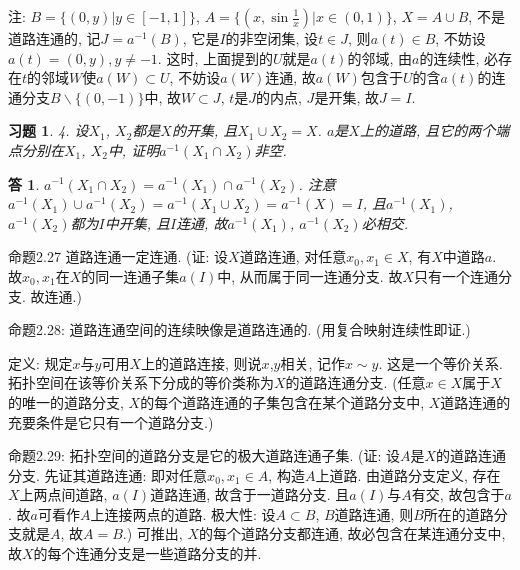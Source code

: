 \documentclass{ctexart}%
\newtheorem*{exercise}{习题}
\newtheorem*{solution}{答}
\theoremstyle{definition}
\theoremstyle{remark}
\begin{document}
注:  $B=\{(0,y)|y\in [-1,1]\}$, $A=\{(x,\sin\frac{1}{x})|x\in (0,1)\}$, $X=A\cup B$, 不是道路连通的,  记$J=a^{-1}(B)$, 它是$I$的非空闭集, 设$t\in J$, 则$a(t)\in B$, 不妨设$a(t)=(0,y), y\neq -1$. 这时, 上面提到的$U$就是$a(t)$的邻域, 由$a$的连续性, 必存在$t$的邻域$W$使$a(W)\subset U$, 不妨设$a(W)$连通, 故$a(W)$包含于$U$的含$a(t)$的连通分支$B\backslash\{(0,-1)\}$中, 故$W\subset J$, $t$是$J$的内点, $J$是开集, 故$J=I$.  

\begin{exercise}4. 设$X_1$, $X_2$都是$X$的开集, 且$X_1\cup X_2= X$. $a$是$X$上的道路, 且它的两个端点分别在$X_1$, $X_2$中, 证明$a^{-1}(X_1\cap X_2)$非空.
\end{exercise}
\begin{solution}
$a^{-1}(X_1\cap X_2)= a^{-1}(X_1) \cap a^{-1}(X_2)$. 注意$a^{-1}(X_1)\cup a^{-1}(X_2) =a^{-1}(X_1\cup X_2)=a^{-1}(X)= I$, 且$a^{-1}(X_1) $, $a^{-1}(X_2)$都为$I$中开集, 且$I$连通, 故$a^{-1}(X_1) $, $a^{-1}(X_2)$必相交. 
\end{solution}

命题2.27 道路连通一定连通. (证: 设$X$道路连通, 对任意$x_0, x_1\in X$, 有$X$中道路$a$. 故$x_0, x_1$在$X$的同一连通子集$a(I)$中, 从而属于同一连通分支. 故$X$只有一个连通分支. 故连通.)

命题2.28: 道路连通空间的连续映像是道路连通的. (用复合映射连续性即证.)

定义: 规定$x$与$y$可用$X$上的道路连接, 则说$x$,$y$相关, 记作$x\sim y$. 这是一个等价关系. 拓扑空间在该等价关系下分成的等价类称为$X$的道路连通分支. (任意$x\in X$属于$X$的唯一的道路分支, $X$的每个道路连通的子集包含在某个道路分支中, $X$道路连通的充要条件是它只有一个道路分支.)

命题2.29: 拓扑空间的道路分支是它的极大道路连通子集. (证: 设$A$是$X$的道路连通分支. 先证其道路连通: 即对任意$x_0,x_1\in A$, 构造$A$上道路. 由道路分支定义, 存在$X$上两点间道路, $a(I)$道路连通, 故含于一道路分支. 且$a(I)$与$A$有交, 故包含于$a$. 故$a$可看作$A$上连接两点的道路. 极大性: 设$A\subset B$, $B$道路连通, 则$B$所在的道路分支就是$A$, 故$A=B$.) 可推出, $X$的每个道路分支都连通, 故必包含在某连通分支中, 故$X$的每个连通分支是一些道路分支的并. 
\end{document}

